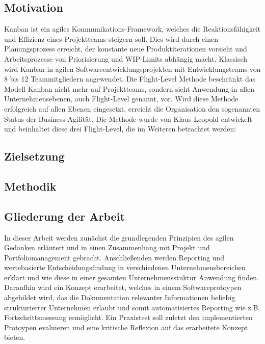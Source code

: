 \subsection{Motivation}
Kanban ist ein agiles Kommunikations-Framework, welches die Reaktionsfähigkeit und Effizienz eines Projektteams steigern soll. Dies wird durch einen Planungsprozess erreicht, der konstante neue Produktiterationen vorsieht und Arbeitsprozesse von Priorisierung und WIP-Limits abhängig macht.
Klassisch wird Kanban in agilen Softwareentwicklungsprojekten mit Entwicklungsteams von 8 bis 12 Teammitgliedern angewendet.
Die Flight-Level Methode beschränkt das Modell Kanban nicht mehr auf Projektteams, sondern sieht Anwendung in allen Unternehmensebenen, auch Flight-Level genannt, vor. Wird diese Methode erfolgreich auf allen Ebenen eingesetzt, erreicht die Organisation den sogenannten Status der Business-Agilität\cite{agilitaetNeuDenken}.
Die Methode wurde von Klaus Leopold entwickelt und beinhaltet diese drei Flight-Level, die im Weiteren betrachtet werden\cite{agilesProjektmanagementImBerufsalltagFlightLevel}:

\subsection{Zielsetzung}

\subsection{Methodik}

\subsection{Gliederung der Arbeit}
In dieser Arbeit werden zunächst die grundlegenden Prinzipien des agilen Gedanken erläutert und in einen Zusammenhang mit Projekt und Portfoliomanagement gebracht. Anschließenden werden Reporting und wertebasierte Entscheidungsfindung in verschiedenen Unternehmensbereichen erklärt und wie diese in einer gesamten Unternehmensstuktur Anwendung finden. Daraufhin wird ein Konzept erarbeitet, welches in einem Softwareprotoypen abgebildet wird, das die Dokumentation relevanter Informationen beliebig strukturierter Unternehmen erlaubt und somit automatisiertes Reporting wie z.B. Fortschrittsmessung ermöglicht. Ein Praxistest soll zuletzt den implementierten Protoypen evaluieren und eine kritische Reflexion auf das erarbeitete Konzept bieten.